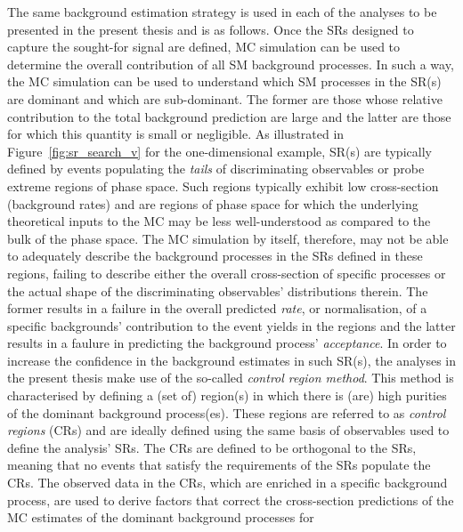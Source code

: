 The same background estimation strategy is used in each of the analyses to be presented in the
present thesis and is as follows.
Once the SRs designed to capture the sought-for signal are defined, MC simulation can be
used to determine the overall contribution of all SM background processes.
In such a way, the MC simulation can be used to understand which SM processes in the SR(s)
are dominant and which are sub-dominant.
The former are those whose relative contribution to the total background prediction
are large and the latter are those for which this quantity is small or negligible.
As illustrated in Figure~\ref{fig:sr_search_v} for the one-dimensional example,
SR(s) are typically defined by events populating the \textit{tails} of discriminating
observables or probe extreme regions of phase space.
Such regions typically exhibit low cross-section (background rates) and
are regions of phase space for which the underlying theoretical inputs
to the MC may be less well-understood as compared to the bulk of the phase space.
The MC simulation by itself, therefore, may not be able to adequately describe the background
processes in the SRs defined in these regions, failing to describe
either the overall cross-section of specific processes or the actual shape of the discriminating observables' distributions
therein.
The former results in a failure in the overall predicted \textit{rate}, or normalisation, of a specific backgrounds' contribution
to the event yields in the regions
and the latter results in a faulure in predicting the background process' \textit{acceptance}.
In order to increase the confidence in the background estimates in such SR(s), the analyses in the present
thesis make use of the so-called \textit{control region method}.
This method is characterised by defining a (set of) region(s) in which there is (are) high purities
of the dominant background process(es).
These regions are referred to as \textit{control regions} (CRs) and are ideally defined using the
same basis of observables used to define the analysis' SRs.
The CRs are defined to be orthogonal to the SRs, meaning that no events that satisfy the requirements of
the SRs populate the CRs.
The observed data in the CRs, which are enriched in a specific background process, are used to derive
factors that correct the cross-section predictions of the MC estimates of the dominant background processes for
